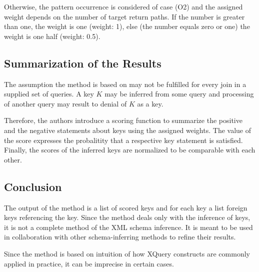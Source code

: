 Otherwise, the pattern occurrence is considered of case (O2) and the assigned weight depends on the number of target return paths. If the number is greater than one, the weight is one (weight: 1), else (the number equals zero or one) the weight is one half (weight: 0.5).

\subsection{Summarization of the Results}

The assumption the method is based on may not be fulfilled for every join in a supplied set of queries. A key $K$ may be inferred from some query and processing of another query may result to denial of $K$ as a key.

Therefore, the authors introduce a scoring function to summarize the positive and the negative statements about keys using the assigned weights. The value of the score expresses the probalitity that a respective key statement is satisfied. Finally, the scores of the inferred keys are normalized to be comparable with each other.

\subsection{Conclusion}
The output of the method is a list of scored keys and for each key a list foreign keys referencing the key. Since the method deals only with the inference of keys, it is not a complete method of the XML schema inference. It is meant to be used in collaboration with other schema-inferring methods to refine their results.

Since the method is based on intuition of how XQuery constructs are commonly applied in practice, it can be imprecise in certain cases.

